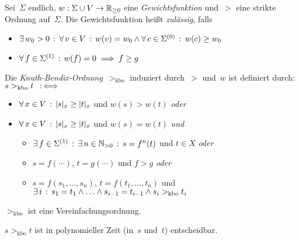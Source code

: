 \documentclass{cheat-sheet}
\newcommand{\size}[1]{\abs{{#1}}} %
\newcommand{\kbo}{>_\text{kbo}} %
\begin{document}



\begin{defn}
  Sei~$\Sigma$ endlich, $w : \Sigma \cup V \to \mathbb{R}_{\geq 0}$ eine \emph{Gewichtsfunktion} und~${>}$ eine strikte Ordnung auf~$\Sigma$.
  Die Gewichtsfunktion heißt \emph{zulässig}, falls
  \begin{itemize}
    \item $\exists \, {w_0 > 0} \,:\, \forall \, {v \in V} \,:\, w(v) = w_0 \wedge \forall \, {c \in \Sigma^{(0)}} \,:\, w(c) \geq w_0$
    \item $\forall \, {f \in \Sigma^{(1)}} \,:\, w(f) = 0 \implies f \geq g$
  \end{itemize}
  Die \emph{Knuth-Bendix-Ordnung}~${\kbo}$ induziert durch~${>}$ und~$w$ ist definiert durch: $s \kbo t \coloniff\,$
  \begin{itemize}
    \item $\fa{x \in V} \size{s}_x \geq \size{t}_x$ und $w(s) > w(t)$ \textit{oder}
    \item $\fa{x \in V} \size{s}_x \geq \size{t}_x$ und $w(s) = w(t)$ \textit{und}
    \begin{itemize}
      \item $\exists \, {f \in \Sigma^{(1)}} \,:\, \exists \, {n \in \mathbb{N}_{> 0}} \,:\, s = f^n(t)$ und $t \in X$ \textit{oder}
      \item $s = f(\cdots)$, $t = g(\cdots)$ und $f > g$ \textit{oder}
      \item $s = f(s_1, \ldots, s_n)$, $t = f(t_1, \ldots, t_n)$ und $\ex{i} s_1 = t_1 \wedge \ldots \wedge s_{i-1} = t_{i-1} \wedge s_i \kbo t_i$
    \end{itemize}
  \end{itemize}
\end{defn}


\begin{thm}
  ${\kbo}$ ist eine Vereinfachungsordnung.
\end{thm}


\begin{prop}
  $s \kbo t$ ist in polynomieller Zeit (in~$s$ und~$t$) entscheidbar.
\end{prop}
\end{document}
